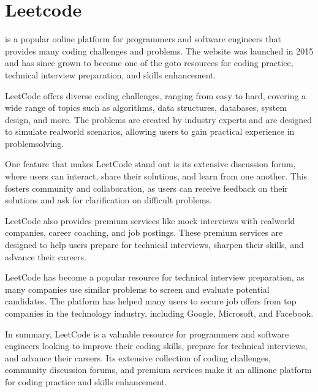 \documentclass[letterpaper,12pt,english]{book}
\begin{document}
\section{Leetcode}
\label{\detokenize{intro:leetcode}}
\sphinxAtStartPar
{}%
\begin{footnote}[2]\sphinxAtStartFootnote
{}
%
\end{footnote} is a popular online platform for programmers and software engineers that provides many coding challenges and problems. The website was launched in 2015 and has since grown to become one of the go\sphinxhyphen{}to resources for coding practice, technical interview preparation, and skills enhancement.

\sphinxAtStartPar
LeetCode offers diverse coding challenges, ranging from easy to hard, covering a wide range of topics such as algorithms, data structures, databases, system design, and more. The problems are created by industry experts and are designed to simulate real\sphinxhyphen{}world scenarios, allowing users to gain practical experience in problem\sphinxhyphen{}solving.

\sphinxAtStartPar
One feature that makes LeetCode stand out is its extensive discussion forum, where users can interact, share their solutions, and learn from one another. This fosters community and collaboration, as users can receive feedback on their solutions and ask for clarification on difficult problems.

\sphinxAtStartPar
LeetCode also provides premium services like mock interviews with real\sphinxhyphen{}world companies, career coaching, and job postings. These premium services are designed to help users prepare for technical interviews, sharpen their skills, and advance their careers.

\sphinxAtStartPar
LeetCode has become a popular resource for technical interview preparation, as many companies use similar problems to screen and evaluate potential candidates. The platform has helped many users to secure job offers from top companies in the technology industry, including Google, Microsoft, and Facebook.

\sphinxAtStartPar
In summary, LeetCode is a valuable resource for programmers and software engineers looking to improve their coding skills, prepare for technical interviews, and advance their careers. Its extensive collection of coding challenges, community discussion forums, and premium services make it an all\sphinxhyphen{}in\sphinxhyphen{}one platform for coding practice and skills enhancement.
\end{document}
